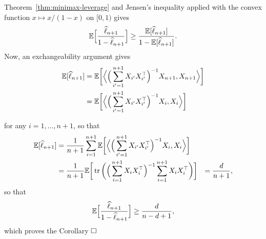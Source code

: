 Theorem~\ref{thm:minimax-leverage} and Jensen's inequality applied with the convex function $x \mapsto x / (1-x)$ on $[0, 1)$ gives
\begin{equation*}
	\mathbb E \Big[ \frac{\widehat \ell_{n+1}}{1 - \widehat \ell_{n+1}} \Big] \geq \frac{\mathbb E[\widehat \ell_{n+1}]}{1 - \mathbb E[\widehat \ell_{n+1}]}.
\end{equation*}
Now, an exchangeability%
argument gives
\begin{align*}
	\mathbb E [\widehat \ell_{n + 1}] &= \mathbb E \bigg[ \Big \langle \Big( \sum_{i'=1}^{n+1} X_{i'} X_{i'}^\top 
	\Big)^{-1} X_{n+1}, X_{n+1} \Big \rangle \bigg] \\
	&= \mathbb E \bigg[ \Big \langle \Big( \sum_{i'=1}^{n+1} X_{i'} X_{i'}^\top \Big)^{-1} X_{i}, X_{i} 
	\Big \rangle \bigg]
\end{align*}

for any $i=1, \ldots, n+1$, so that
\begin{align*}
 	\mathbb E [\widehat \ell_{n + 1}] &= \frac{1}{n+1} \sum_{i=1}^{n+1} \mathbb E \bigg[ \Big \langle \Big( \sum_{i'=1}^{n+1} X_{i'} X_{i'}^\top \Big)^{-1} X_{i}, X_{i} \Big \rangle \bigg] \\
 	&= \frac{1}{n+1}  \mathbb E \bigg [ \operatorname{tr} \bigg( \Big( \sum_{i=1}^{n+1} X_i X_i^\top \Big)^{-1} \sum_{i=1}^{n+1} X_i X_i^\top \bigg) \bigg] 
 	&= \frac{d}{n + 1},
 \end{align*}
so that
\begin{equation*}
	\mathbb E \Big[ \frac{\widehat \ell_{n+1}}{1 - \widehat \ell_{n+1}} \Big] \geq \frac{d}{n - d + 1},
\end{equation*}
which proves the Corollary $\hfill \square$
